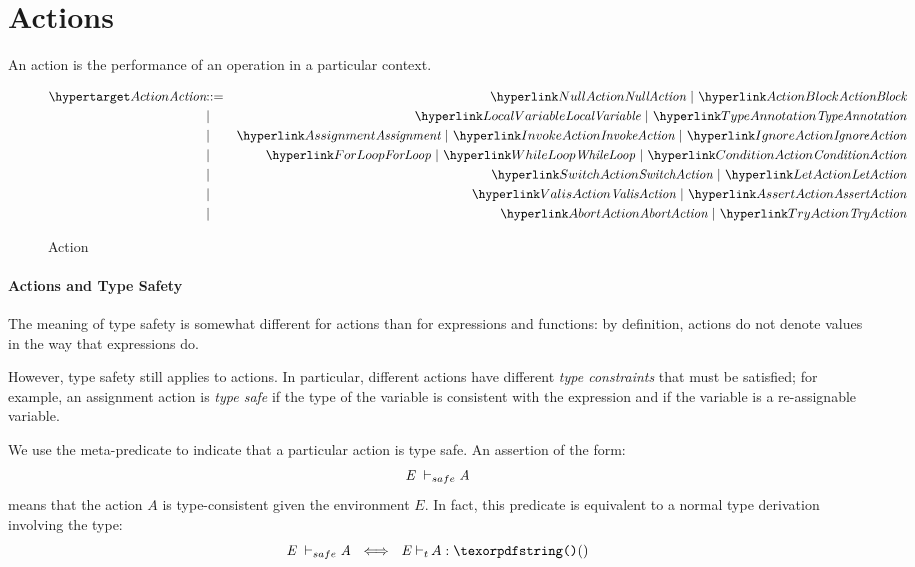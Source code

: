 \chapter{Actions}
\label{actions}

An action is the performance of an operation in a particular context. 

\begin{figure}[htbp]
\begin{eqnarray*}
\ntDef{Action}&\arrow&\ntRef{NullAction}\ \choice\ \ntRef{ActionBlock}\\
&\choice&\ntRef{LocalVariable}\ \choice\ \ntRef{TypeAnnotation}\\
&\choice&\ntRef{Assignment}\ \choice\ \ntRef{InvokeAction}\ \choice\ \ntRef{IgnoreAction}\\
&\choice&\ntRef{ForLoop}\ \choice\ \ntRef{WhileLoop}\ \choice\ \ntRef{ConditionAction}\\
&\choice&\ntRef{SwitchAction}\ \choice\ \ntRef{LetAction}\\
&\choice&\ntRef{ValisAction}\ \choice\ \ntRef{AssertAction}\\
&\choice&\ntRef{AbortAction}\ \choice\ \ntRef{TryAction}
\end{eqnarray*}
\caption{Action}
\label{actionFig}
\end{figure}

\subsubsection{Actions and Type Safety}
\label{actionTypeSafety}
The meaning of type safety is somewhat different for actions than for expressions and functions: by definition, actions do not denote values in the way that expressions do.

However, type safety still applies to actions. In particular, different actions have different \emph{type constraints} that must be satisfied; for example, an assignment action is \emph{type safe} if the type of the variable is consistent with the expression and if the variable is a re-assignable variable.

We use the meta-predicate \safeinf{} to indicate that a particular action is type safe. An assertion of the form:
\[\emph{E}~\vdash_{safe}\emph{A}\]
means that the action $A$ is type-consistent given the environment $E$. In fact, this predicate is equivalent to a normal type derivation involving the \q{()} type:
\[\typesafe{E}{A}\ \iff\ \typeprd{E}{A}{\q{()}}\]

